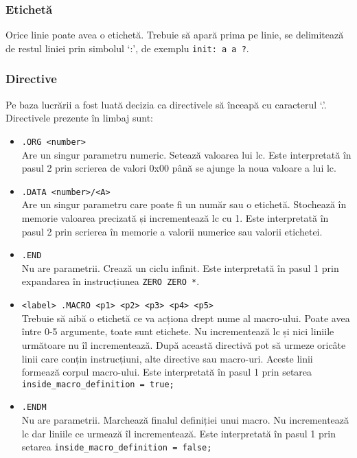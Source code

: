 \documentclass[../main.tex]{subfiles}
\begin{document}
\subsubsection{Etichetă}
Orice linie poate avea o etichetă. Trebuie să apară prima pe linie, se delimitează de restul liniei prin
simbolul `:', de exemplu \texttt{init: a a ?}.

\subsubsection{Directive}
Pe baza lucrării \cite{asl} a fost luată decizia ca directivele să înceapă cu caracterul `.'. Directivele prezente în limbaj sunt:
\begin{itemize}
    \item \verb|.ORG <number>|\\
    Are un singur parametru numeric. Setează valoarea lui \acrshort{lc}. Este interpretată în pasul 2 prin
    scrierea de valori 0x00 până se ajunge la noua valoare a lui \acrshort{lc}.
    \item \verb|.DATA <number>/<A>|\\
    Are un singur parametru care poate fi un număr sau o etichetă. Stochează în memorie valoarea precizată și 
    incrementează \acrshort{lc} cu 1. Este interpretată în pasul 2 prin scrierea în memorie a valorii
    numerice sau valorii etichetei.
    \item \verb|.END|\\
    Nu are parametrii. Crează un ciclu infinit. Este interpretată în pasul 1 prin expandarea în instrucțiunea 
    \texttt{ZERO ZERO *}.
    \item \verb|<label> .MACRO <p1> <p2> <p3> <p4> <p5>|\\
    Trebuie să aibă o etichetă ce va acționa drept nume al macro-ului. Poate avea între 0-5 argumente, toate sunt etichete.
    Nu incrementează \acrshort{lc} și nici liniile următoare nu îl incrementează. După această directivă pot să
    urmeze oricâte linii care conțin instrucțiuni, alte directive sau macro-uri. Aceste linii formează corpul
    macro-ului. Este interpretată în pasul 1 prin setarea \allowbreak \texttt{inside\_macro\_definition = true;}
    \item \verb|.ENDM|\\
    Nu are parametrii. Marchează finalul definiției unui macro. Nu incrementează \acrshort{lc} dar liniile ce urmează
    îl incrementează. Este interpretată în pasul 1 prin setarea \allowbreak \texttt{inside\_macro\_definition = false;}
\end{itemize}
\end{document}
